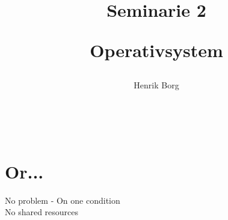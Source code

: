 \documentclass[10pt,a4paper]{article}
\title{{\Huge \textbf{Seminarie 2}}\\ \begin{LARGE}
\textbf{Operativsystem}
\end{LARGE}}
\author{\begin{Large}Henrik Borg\end{Large}}
\begin{document}
\maketitle
\begin{center}
\\[5\baselineskip]
\section*{{\huge Or...}}
\begin{LARGE}
No problem - On one condition\\
No shared resources\\
\end{LARGE}
\end{center}

\pagebreak\\
\end{document}

